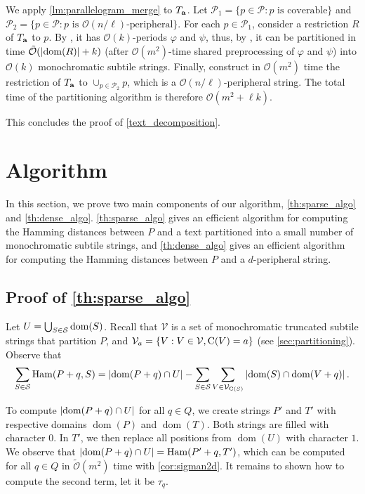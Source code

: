 \documentclass[11pt, letterpaper]{article}
\theoremstyle{plain}
\theoremstyle{definition}
\theoremstyle{remark}
\renewcommand{\O}{\mathcal{O}}
\newcommand{\tO}{\tilde{\mathcal{O}}}
\renewcommand{\S}{\mathcal{S}}
\newcommand{\V}{\mathcal{V}}
\renewcommand{\phi}{\varphi}
\newcommand{\set}[1]{\left\lbrace #1 \right\rbrace}
\DeclareMathOperator*{\Ham}{Ham}
\DeclareMathOperator*{\dom}{dom}
\newcommand{\absolute}[1]{\left\lvert#1\right\rvert}
\begin{document}
We apply \cref{lm:parallelogram_merge} to $T_\mathbf{a}$. Let $\mathcal{P}_1 = \{p \in \mathcal{P} : p \text { is coverable}\}$ and $\mathcal{P}_2 = \{p \in \mathcal{P} : p \text { is }\O(n/\ell)\text{-peripheral}\}$. For each $p \in \mathcal{P}_1$, consider a restriction $R$ of $T_\mathbf{a}$ to $p$. By , it has $\O(k)$-periods $\phi$ and $\psi$, thus, by , it can be partitioned in time $\tO(\absolute{\d{R}} + k)$ (after $\O(m^2)$-time shared preprocessing of $\phi$ and $\psi$) into $\O(k)$ monochromatic subtile strings. Finally, construct in $\O(m^2)$ time the restriction of $T_\mathbf{a}$ to $\cup_{p \in \mathcal{P}_2} p$, which is a $\O(n / \ell)$-peripheral string. The total time of the partitioning algorithm is therefore $\O(m^2+\ell k)$.

This concludes the proof of \cref{text_decomposition}.

\section{Algorithm}
\label{sec:algorithm}
In this section, we prove two main components of our algorithm, \cref{th:sparse_algo} and \cref{th:dense_algo}. \cref{th:sparse_algo} gives an efficient algorithm for computing the Hamming distances between $P$ and a text partitioned into a small number of monochromatic subtile strings, and \cref{th:dense_algo} gives an efficient algorithm for computing the Hamming distances between $P$ and a $d$-peripheral string.

\subsection{Proof of \cref{th:sparse_algo}}
\SparseAlgo*
Let $U = \bigcup_{S \in \S} \d{S}$. Recall that $\V$ is a set of monochromatic truncated subtile strings that partition $P$, and $\V_a = \set{V : V \in \V, \getchar{V} = a}$ (see \cref{sec:partitioning}).
 Observe that
\begin{align}
\label{eq:sparse}
\sum_{S \in \S} \Ham(P + q, S) = \absolute{\d{P + q} \cap U} - \sum_{S \in \S}\sum_{V \in \V_{\getchar{S}}} \absolute{\d{S} \cap \d{V + q}}.
\end{align}

To compute $\absolute{\d{P + q} \cap U}$ for all $q \in Q$, we create strings $P'$ and $T'$ with respective domains $\dom(P)$ and $\dom(T)$. Both strings are filled with character $0$. 
In $T'$, we then replace all positions from $\dom(U)$ with character $1$. 
We observe that $\absolute{\d{P + q} \cap U} = \Ham(P' + q, T')$, which can be computed for all $q \in Q$ in $\tO(m^2)$ time with \cref{cor:sigman2d}.
It remains to shown how to compute the second term, let it be $\tau_q$. 
\end{document}
